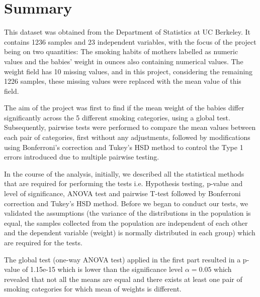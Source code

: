 \documentclass[fontsize=12 pt]{scrartcl}
\begin{document}
\section{Summary}

This dataset was obtained from the Department of Statistics at UC Berkeley. It contains 1236 samples and 23 independent variables, with the focus of the project being on two quantities: The smoking habits of mothers labelled as numeric values and the babies' weight in ounces also containing numerical values. The weight field has 10 missing values, and in this project, considering the remaining 1226 samples, these missing values were replaced with the mean value of this field.

The aim of the project was first to find if the mean weight of the babies differ significantly across the 5 different smoking categories, using a global test. Subsequently, pairwise tests were performed to compare the mean values between each pair of categories, first without any adjustments, followed by modifications using Bonferroni's correction and Tukey's HSD method to control the Type 1 errors introduced due to multiple pairwise testing.

In the course of the analysis, initially, we described all the statistical methods that are required for performing the tests i.e. Hypothesis testing, p-value and level of significance, ANOVA test and pairwise T-test followed by Bonferroni correction and Tukey's HSD method. Before we began to conduct our tests, we validated the assumptions (the variance of the distributions in the population is equal, the samples collected from the population are independent of each other and the dependent variable (weight) is normally distributed in each group) which are required for the tests. 

The global test (one-way ANOVA test) applied in the first part resulted in a p-value of 1.15e-15 which is lower than the significance level $\alpha=0.05$ which revealed that not all the means are equal and there exists at least one pair of smoking categories for which mean of weights is different.
\end{document}
